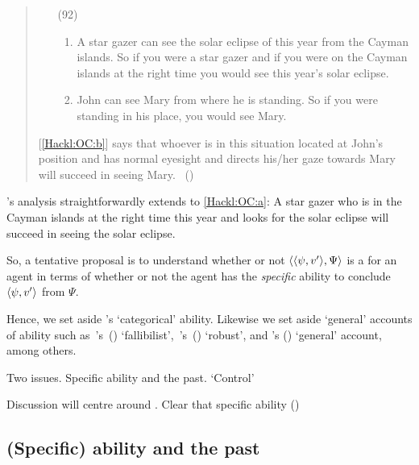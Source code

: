 \begin{note}
  \begin{quote}
    \begin{enumerate}
    \item[(92)]
      \begin{enumerate}[label=\alph*., ref=(\alph*)]
      \item
        \label{Hackl:OC:a}
        A star gazer can see the solar eclipse of this year from the Cayman islands.\newline
        So if you were a star gazer and if you were on the Cayman islands at the right time you would see this year's solar eclipse.
      \item
        \label{Hackl:OC:b}
        John can see Mary from where he is standing.\newline
        So if you were standing in his place, you would see Mary.
      \end{enumerate}
    \end{enumerate}

    [\ref{Hackl:OC:b}] says that whoever is in this situation located at John's position and has normal eyesight and directs his/her gaze towards Mary will succeed in seeing Mary.%
    \mbox{ }\hfill\mbox{(\citeyear[39]{Hackl:1998tt})}
  \end{quote}
  \citeauthor{Hackl:1998tt}'s analysis straightforwardly extends to \ref{Hackl:OC:a}:
  A star gazer who is in the Cayman islands at the right time this year and looks for the solar eclipse will succeed in seeing the solar eclipse.

  So, a tentative proposal is to understand whether or not \(\langle \langle \psi, v' \rangle, \Psi \rangle\) is a \fc{} for an agent in terms of whether or not the agent has the \emph{specific} ability to conclude \(\langle \psi, v' \rangle\) from \(\Psi\).

  Hence, we set aside \citeauthor{Austin:1961vz}'s `categorical' ability.
  Likewise we set aside `general' accounts of ability such as~\citeauthor{Carter:2021wd}'s~(\citeyear{Carter:2021wd}) `fallibilist',~\citeauthor{Kikkert:2022wp}'s~(\citeyear{Kikkert:2022wp}) `robust', and \citeauthor{Maier:2013vk}'s (\citeyear{Maier:2013vk}) `general' account, among others.

  Two issues.
  Specific ability and the past.
  `Control'

  Discussion will centre around \textcite{Boylan:2020aa}.
  Clear that specific ability (\citeyear[23, fn.3]{Boylan:2020aa})
\end{note}

\subsection{(Specific) ability and the past}
\label{cha:sec:fcs-def:ability:past}

